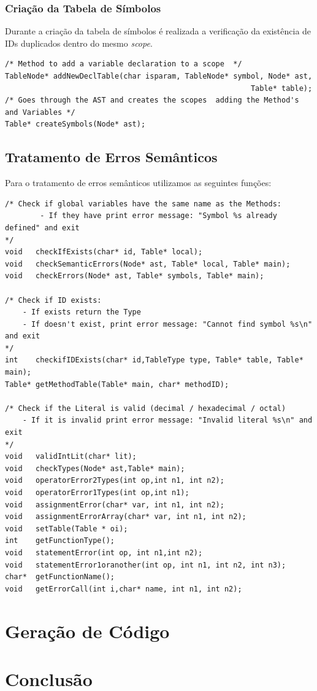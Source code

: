 \documentclass[12pt]{article}
\begin{document}
\subsubsection{Criação da Tabela de Símbolos}

Durante a criação da tabela de símbolos é realizada a verificação da existência de IDs duplicados dentro do mesmo \emph{scope}.

\begin{lstlisting}
/* Method to add a variable declaration to a scope  */
TableNode* addNewDeclTable(char isparam, TableNode* symbol, Node* ast,
												    	Table* table);
/* Goes through the AST and creates the scopes  adding the Method's and Variables */												    	
Table* createSymbols(Node* ast);
\end{lstlisting}

\pagebreak
\subsection{Tratamento de Erros Semânticos}
Para o tratamento de erros semânticos utilizamos as seguintes funções:
\begin{lstlisting}
/* Check if global variables have the same name as the Methods:
		- If they have print error message: "Symbol %s already defined" and exit 
*/
void   checkIfExists(char* id, Table* local);
void   checkSemanticErrors(Node* ast, Table* local, Table* main);
void   checkErrors(Node* ast, Table* symbols, Table* main);

/* Check if ID exists:
	- If exists return the Type 
	- If doesn't exist, print error message: "Cannot find symbol %s\n" and exit 
*/
int    checkifIDExists(char* id,TableType type, Table* table, Table* main);
Table* getMethodTable(Table* main, char* methodID);

/* Check if the Literal is valid (decimal / hexadecimal / octal)
	- If it is invalid print error message: "Invalid literal %s\n" and exit
*/
void   validIntLit(char* lit);
void   checkTypes(Node* ast,Table* main);
void   operatorError2Types(int op,int n1, int n2);
void   operatorError1Types(int op,int n1);
void   assignmentError(char* var, int n1, int n2);
void   assignmentErrorArray(char* var, int n1, int n2);
void   setTable(Table * oi);
int    getFunctionType();
void   statementError(int op, int n1,int n2);
void   statementError1oranother(int op, int n1, int n2, int n3);
char*  getFunctionName();
void   getErrorCall(int i,char* name, int n1, int n2);

\end{lstlisting}
\pagebreak
\section{Geração de Código}

\section{Conclusão}
	
\end{document}
